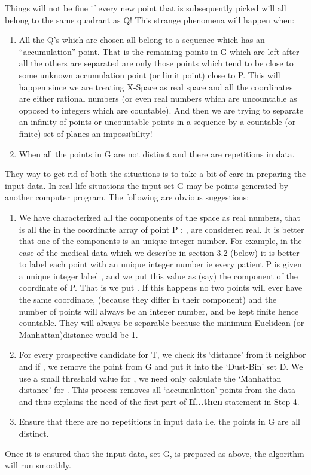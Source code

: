 \documentclass[english]{article}
\begin{document}
Things will not be fine if every new point that is subsequently picked
will all belong to the same quadrant as Q! This strange phenomena
will happen when: 
\begin{enumerate}
\item All the Q's which are chosen all belong to a sequence which has an
{}``accumulation'' point. That is the remaining points in G which
are left after all the others are separated are only those points
which tend to be close to some unknown accumulation point (or limit
point) close to P. This will happen since we are treating X-Space
as real space and all the coordinates 
are either rational numbers (or even real numbers which are uncountable as opposed to integers which
are countable). And then we are trying to separate an infinity of points  or uncountable points in a sequence by a countable (or finite) set of planes an impossibility! 
\item When all the points in G are not distinct and there are repetitions
in data. 
\end{enumerate}
They way to get rid of both the situations is to take a bit of care
in preparing the input data. In real life situations the input set G may be points generated by another computer program. The following are obvious suggestions:
\begin{enumerate}
\item We have characterized all the components of the  space as real
numbers, that is all the  in the coordinate array of point P
: , are considered real. It is better
that one of the components is an unique integer number. For example,
in the case of the medical data which we describe in section 3.2 (below)
it is better to label each point with an unique integer number ie
every patient P is given a unique integer label , and we put
this value as (say) the  component of the coordinate of
P. That is we put . If this happens no two points will
ever have the same coordinate, (because they differ in their 
component) and the number of points will always be an integer number,
and be kept finite hence countable. They will always be separable because the minimum
Euclidean (or Manhattan)distance would be 1.
\item For every prospective candidate for T, we check its `distance' 
from it neighbor and if  , we remove the point
from G and put it into the `Dust-Bin' set D. We use a small threshold
value for , we need only calculate the `Manhattan distance'
for . This process removes all `accumulation' points from
the data and thus explains the need of the first part of \textbf{If...then}
statement in Step 4.
\item Ensure that there are no repetitions in input data i.e. the points
in G are all distinct.
\end{enumerate}
Once it is ensured that the input data, set G, is prepared as above,
the algorithm will run smoothly.
\end{document}
